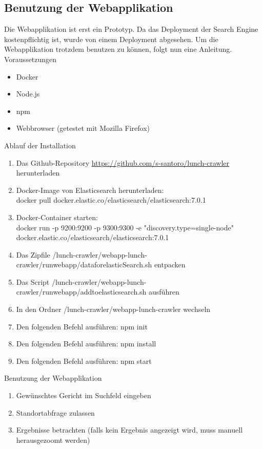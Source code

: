 \subsection{Benutzung der Webapplikation}
Die Webapplikation ist erst ein Prototyp.
Da das Deployment der Search Engine kostenpflichtig ist, wurde von einem Deployment abgesehen.
Um die Webapplikation trotzdem benutzen zu können, folgt nun eine Anleitung.\\

Voraussetzungen
\begin{itemize}
	\item Docker
	\item Node.js
	\item npm
	\item Webbrowser (getestet mit Mozilla Firefox)
\end{itemize}
Ablauf der Installation
\begin{enumerate}
	\item Das Github-Repository \url{https://github.com/s-santoro/lunch-crawler} herunterladen
	\item Docker-Image von Elasticsearch herunterladen:\\
	docker pull docker.elastic.co/elasticsearch/elasticsearch:7.0.1
	\item Docker-Container starten:\\
	docker run -p 9200:9200 -p 9300:9300 -e "discovery.type=single-node" \\ docker.elastic.co/elasticsearch/elasticsearch:7.0.1
	\item Das Zipfile \glqq/lunch-crawler/webapp-lunch-crawler/run\textunderscore webapp/data\textunderscore for\textunderscore elasticSearch.sh\grqq{} entpacken
	\item Das Script \glqq/lunch-crawler/webapp-lunch-crawler/run\textunderscore webapp/add\textunderscore to\textunderscore elasticsearch.sh\grqq{} ausführen
	\item In den Ordner \glqq/lunch-crawler/webapp-lunch-crawler\grqq{} wechseln
	\item Den folgenden Befehl ausführen: npm init
	\item Den folgenden Befehl ausführen: npm install
	\item Den folgenden Befehl ausführen: npm start
\end{enumerate}
Benutzung der Webapplikation
\begin{enumerate}
	\item Gewünschtes Gericht im Suchfeld eingeben
	\item Standortabfrage zulassen
	\item Ergebnisse betrachten (falls kein Ergebnis angezeigt wird, muss manuell herausgezoomt werden)
\end{enumerate}
